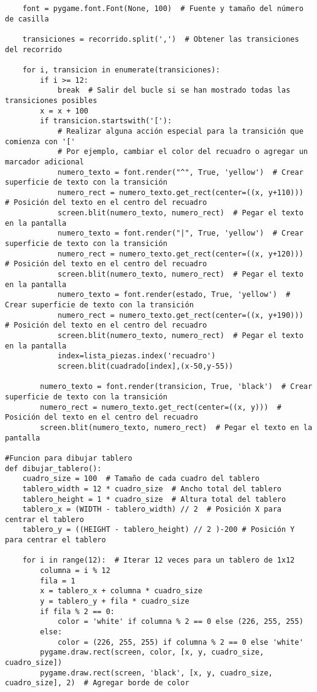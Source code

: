 \begin{lstlisting}
    font = pygame.font.Font(None, 100)  # Fuente y tamaño del número de casilla

    transiciones = recorrido.split(',')  # Obtener las transiciones del recorrido

    for i, transicion in enumerate(transiciones):
        if i >= 12:
            break  # Salir del bucle si se han mostrado todas las transiciones posibles
        x = x + 100
        if transicion.startswith('['):
            # Realizar alguna acción especial para la transición que comienza con '['
            # Por ejemplo, cambiar el color del recuadro o agregar un marcador adicional
            numero_texto = font.render("^", True, 'yellow')  # Crear superficie de texto con la transición
            numero_rect = numero_texto.get_rect(center=((x, y+110)))  # Posición del texto en el centro del recuadro
            screen.blit(numero_texto, numero_rect)  # Pegar el texto en la pantalla
            numero_texto = font.render("|", True, 'yellow')  # Crear superficie de texto con la transición
            numero_rect = numero_texto.get_rect(center=((x, y+120)))  # Posición del texto en el centro del recuadro
            screen.blit(numero_texto, numero_rect)  # Pegar el texto en la pantalla
            numero_texto = font.render(estado, True, 'yellow')  # Crear superficie de texto con la transición
            numero_rect = numero_texto.get_rect(center=((x, y+190)))  # Posición del texto en el centro del recuadro
            screen.blit(numero_texto, numero_rect)  # Pegar el texto en la pantalla
            index=lista_piezas.index('recuadro')
            screen.blit(cuadrado[index],(x-50,y-55))
            
        numero_texto = font.render(transicion, True, 'black')  # Crear superficie de texto con la transición
        numero_rect = numero_texto.get_rect(center=((x, y)))  # Posición del texto en el centro del recuadro
        screen.blit(numero_texto, numero_rect)  # Pegar el texto en la pantalla
 
#Funcion para dibujar tablero
def dibujar_tablero():
    cuadro_size = 100  # Tamaño de cada cuadro del tablero
    tablero_width = 12 * cuadro_size  # Ancho total del tablero
    tablero_height = 1 * cuadro_size  # Altura total del tablero
    tablero_x = (WIDTH - tablero_width) // 2  # Posición X para centrar el tablero
    tablero_y = ((HEIGHT - tablero_height) // 2 )-200 # Posición Y para centrar el tablero

    for i in range(12):  # Iterar 12 veces para un tablero de 1x12
        columna = i % 12
        fila = 1
        x = tablero_x + columna * cuadro_size
        y = tablero_y + fila * cuadro_size
        if fila % 2 == 0:
            color = 'white' if columna % 2 == 0 else (226, 255, 255)
        else:
            color = (226, 255, 255) if columna % 2 == 0 else 'white'
        pygame.draw.rect(screen, color, [x, y, cuadro_size, cuadro_size])
        pygame.draw.rect(screen, 'black', [x, y, cuadro_size, cuadro_size], 2)  # Agregar borde de color 
       
 
\end{lstlisting}
